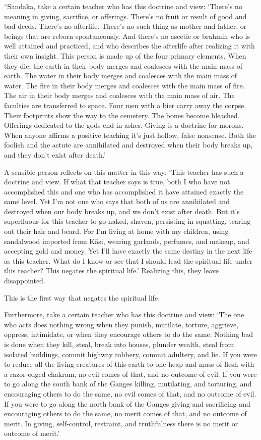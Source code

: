 \documentclass[12pt,openany]{book}%
\begin{document}
“Sandaka, take a certain teacher who has this doctrine and view: ‘There’s no meaning in giving, sacrifice, or offerings. There’s no fruit or result of good and bad deeds. There’s no afterlife. There’s no such thing as mother and father, or beings that are reborn spontaneously. And there’s no ascetic or brahmin who is well attained and practiced, and who describes the afterlife after realizing it with their own insight. This person is made up of the four primary elements. When they die, the earth in their body merges and coalesces with the main mass of earth. The water in their body merges and coalesces with the main mass of water. The fire in their body merges and coalesces with the main mass of fire. The air in their body merges and coalesces with the main mass of air. The faculties are transferred to space. Four men with a bier carry away the corpse. Their footprints show the way to the cemetery. The bones become bleached. Offerings dedicated to the gods end in ashes. Giving is a doctrine for morons. When anyone affirms a positive teaching it’s just hollow, false nonsense. Both the foolish and the astute are annihilated and destroyed when their body breaks up, and they don’t exist after death.’ 

A sensible person reflects on this matter in this way: ‘This teacher has such a doctrine and view. If what that teacher says is true, both I who have not accomplished this and one who has accomplished it have attained exactly the same level. Yet I’m not one who says that both of us are annihilated and destroyed when our body breaks up, and we don’t exist after death. But it’s superfluous for this teacher to go naked, shaven, persisting in squatting, tearing out their hair and beard. For I’m living at home with my children, using sandalwood imported from \textsanskrit{Kāsi}, wearing garlands, perfumes, and makeup, and accepting gold and money. Yet I’ll have exactly the same destiny in the next life as this teacher. What do I know or see that I should lead the spiritual life under this teacher? This negates the spiritual life.’ Realizing this, they leave disappointed. 

This is the first way that negates the spiritual life. 

Furthermore, take a certain teacher who has this doctrine and view: ‘The one who acts does nothing wrong when they punish, mutilate, torture, aggrieve, oppress, intimidate, or when they encourage others to do the same. Nothing bad is done when they kill, steal, break into houses, plunder wealth, steal from isolated buildings, commit highway robbery, commit adultery, and lie. If you were to reduce all the living creatures of this earth to one heap and mass of flesh with a razor-edged chakram, no evil comes of that, and no outcome of evil. If you were to go along the south bank of the Ganges killing, mutilating, and torturing, and encouraging others to do the same, no evil comes of that, and no outcome of evil. If you were to go along the north bank of the Ganges giving and sacrificing and encouraging others to do the same, no merit comes of that, and no outcome of merit. In giving, self-control, restraint, and truthfulness there is no merit or outcome of merit.’ 
\end{document}
